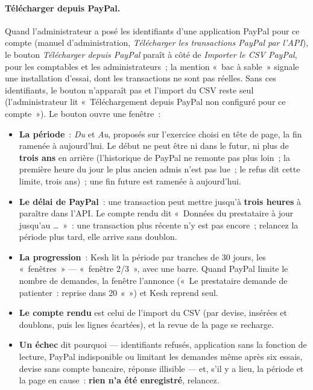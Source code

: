 \documentclass[a4paper,11pt,oneside]{article}
\begin{document}
\paragraph{Télécharger depuis PayPal.}\label{sec:paypal-telecharger} Quand l'administrateur a posé les identifiants d'une application PayPal pour ce compte (manuel d'administration, \emph{Télécharger les transactions PayPal par l'API}), le bouton \emph{Télécharger depuis PayPal} paraît à côté de \emph{Importer le CSV PayPal}, pour les comptables et les administrateurs~; la mention «~bac à sable~» signale une installation d'essai, dont les transactions ne sont pas réelles. Sans ces identifiants, le bouton n'apparaît pas et l'import du CSV reste seul (l'administrateur lit «~Téléchargement depuis PayPal non configuré pour ce compte~»). Le bouton ouvre une fenêtre~:
\begin{itemize}
    \item \textbf{La période}~: \emph{Du} et \emph{Au}, proposés sur l'exercice choisi en tête de page, la fin ramenée à aujourd'hui. Le début ne peut être ni dans le futur, ni plus de \textbf{trois ans} en arrière (l'historique de PayPal ne remonte pas plus loin~; la première heure du jour le plus ancien admis n'est pas lue~; le refus dit cette limite, trois ans)~; une fin future est ramenée à aujourd'hui.
    \item \textbf{Le délai de PayPal}~: une transaction peut mettre jusqu'à \textbf{trois heures} à paraître dans l'API. Le compte rendu dit «~Données du prestataire à jour jusqu'au \ldots~»~: une transaction plus récente n'y est pas encore~; relancez la période plus tard, elle arrive sans doublon.
    \item \textbf{La progression}~: Kesh lit la période par tranches de 30 jours, les «~fenêtres~» --- «~fenêtre 2/3~», avec une barre. Quand PayPal limite le nombre de demandes, la fenêtre l'annonce («~Le prestataire demande de patienter~: reprise dans 20~s~») et Kesh reprend seul.
    \item \textbf{Le compte rendu} est celui de l'import du CSV (par devise, insérées et doublons, puis les lignes écartées), et la revue de la page se recharge.
    \item \textbf{Un échec} dit pourquoi --- identifiants refusés, application sans la fonction de lecture, PayPal indisponible ou limitant les demandes même après six essais, devise sans compte bancaire, réponse illisible --- et, s'il y a lieu, la période et la page en cause~: \textbf{rien n'a été enregistré}, relancez.

\end{itemize}
\end{document}
